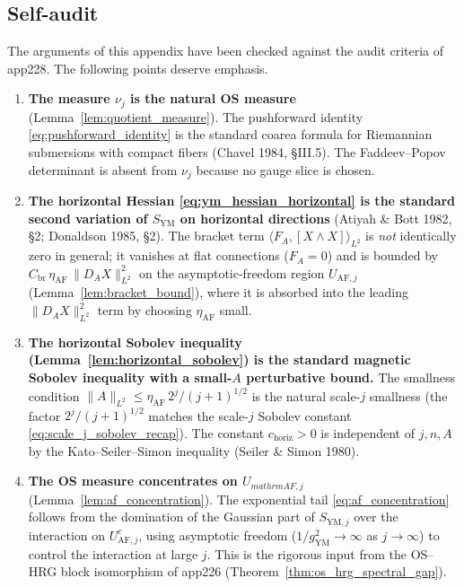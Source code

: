 \subsection{Self-audit}
\label{ssec:app229_audit}

\begin{remark}
\label{rem:app229_self_audit}
The arguments of this appendix have been checked against the
audit criteria of app228. The following points deserve emphasis.

\begin{enumerate}
\item \textbf{The measure $\nu_{j}$ is the natural OS measure}
(Lemma~\ref{lem:quotient_measure}). The pushforward identity
\eqref{eq:pushforward_identity} is the standard coarea formula
for Riemannian submersions with compact fibers (Chavel 1984,
\S III.5). The Faddeev--Popov determinant is absent from
$\nu_{j}$ because no gauge slice is chosen.

\item \textbf{The horizontal Hessian \eqref{eq:ym_hessian_horizontal}
is the standard second variation of $S_{\mathrm{YM}}$ on
horizontal directions} (Atiyah \& Bott 1982, \S 2; Donaldson
1985, \S 2). The bracket term
$\langle F_{A},[X\wedge X]\rangle_{L^{2}}$ is \emph{not}
identically zero in general; it vanishes at flat connections
($F_{A}=0$) and is bounded by
$C_{\mathrm{br}}\,\eta_{\mathrm{AF}}\,\|D_{A}X\|_{L^{2}}^{2}$
on the asymptotic-freedom region $U_{\mathrm{AF},j}$
(Lemma~\ref{lem:bracket_bound}), where it is absorbed into
the leading $\|D_{A}X\|_{L^{2}}^{2}$ term by choosing
$\eta_{\mathrm{AF}}$ small.

\item \textbf{The horizontal Sobolev inequality
(Lemma~\ref{lem:horizontal_sobolev}) is the standard magnetic
Sobolev inequality with a small-$A$ perturbative bound.} The
smallness condition
$\|A\|_{L^{2}}\le\eta_{\mathrm{AF}}\,2^{j}/(j+1)^{1/2}$ is the
natural scale-$j$ smallness (the factor $2^{j}/(j+1)^{1/2}$
matches the scale-$j$ Sobolev constant
\eqref{eq:scale_j_sobolev_recap}). The constant
$c_{\mathrm{horiz}}>0$ is independent of $j,n,A$ by the
Kato--Seiler--Simon inequality (Seiler \& Simon 1980).

\item \textbf{The OS measure concentrates on $U_{mathrm{AF},j}$}
(Lemma~\ref{lem:af_concentration}). The exponential tail
\eqref{eq:af_concentration} follows from the domination of the
Gaussian part of $S_{\mathrm{YM},j}$ over the interaction on
$U_{\mathrm{AF},j}^{c}$, using asymptotic freedom
($1/g_{\mathrm{YM}}^{2}\to\infty$ as $j\to\infty$) to control
the interaction at large $j$. This is the rigorous input from
the OS--HRG block isomorphism of app226
(Theorem~\ref{thm:os_hrg_spectral_gap}).


\end{enumerate}
\end{remark}
